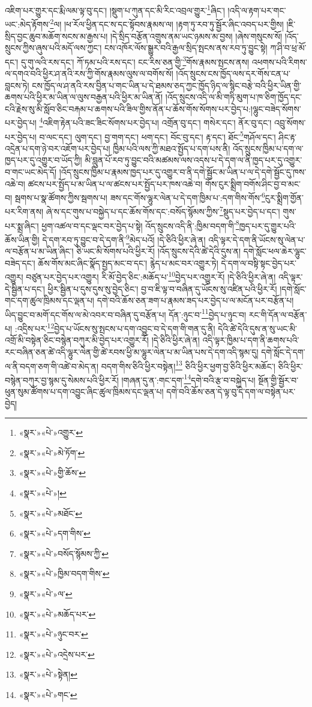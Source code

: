འཇིག་པར་གྱུར་དང་རྨི་ལམ་ལྟ་བུ་དང་། །སྡུག་པ་ཀུན་དང་མི་རིང་འབྲལ་གྱུར་\footnote{«སྣར་»«པེ་»འགྱུར་}ཞིང་། །འདི་ལ་རྟག་པར་གང་ཡང་:མེད་རྟོགས་\footnote{«སྣར་»«པེ་»མེ་ཏོག་}ལ། །ཕ་རོལ་ཕྱིན་དང་ས་དང་སྟོབས་རྣམས་ལ། །རྟག་ཏུ་རབ་ཏུ་སྦྱོར་ཞིང་འབད་པར་གྱིས། །ཇི་སྲིད་བྱང་ཆུབ་མཆོག་སངས་མ་རྒྱས་པ། །དེ་སྲིད་བརྩོན་འགྲུས་ནམ་ཡང་ཉམས་མ་བྱས། །ཞེས་གསུངས་སོ། །འོད་སྲུངས་ཀྱིས་ཞུས་པའི་མདོ་ལས་ཀྱང་། ངས་འཁོར་ལོས་སྒྱུར་བའི་རྒྱལ་སྲིད་སྤངས་ནས་རབ་ཏུ་བྱུང་སྟེ། ཀ་ཤི་བ་ཕྲ་མོ་དང་། དུ་གུ་ལའི་རས་དང་། ཀོ་ཏམ་པའི་རས་དང་། ངང་རིས་ཅན་གྱི་\footnote{«སྣར་»«པེ་»གྱི་ཆོས་}གོས་རྣམས་སྤངས་ནས། འཕགས་པའི་རིགས་ལ་དགའ་བའི་ཕྱིར་ཤ་ནའི་རས་ཀྱི་གོས་རྣམས་ལུས་ལ་བགོས་སོ། །འོད་སྲུངས་ངས་ཁྱོད་ལས་དར་གོས་ངན་པ་བླངས་ཏེ། ངས་ཁྱོད་ལ་ཤ་ནའི་རས་བྱིན་པ་གང་ཡིན་པ་དེ་ཐམས་ཅད་ཀྱང་ཁྱོད་ཉིད་ལ་སྙིང་བརྩེ་བའི་ཕྱིར་ཡིན་གྱི་ཆགས་པའི་ཕྱིར་མ་ཡིན་ལ་ལུས་བརྒྱན་པའི་ཕྱིར་མ་ཡིན་ནོ། །འོད་སྲུངས་འདི་ལ་མི་གཏི་མུག་པ་ཁ་ཅིག་ཁྱོད་དང་ངའི་རྗེས་སུ་མི་སློབ་ཅིང་བརྐམ་པ་ཆགས་པའི་ཟིལ་གྱིས་ནོན་པ་ཆོས་གོས་སོགས་པར་བྱེད་པ:།ལྷུང་བཟེད་སོགས་པར་བྱེད་པ། \footnote{«སྣར་»«པེ་»། }འཇིག་རྟེན་པའི་ཟང་ཟིང་སོགས་པར་བྱེད་པ། འགྲོན་བུ་དང་། གསེར་དང་། ནོར་བུ་དང་། འབྲུ་སོགས་པར་བྱེད་པ། བ་ལང་དང་། ལུག་དང་། བྱ་གག་དང་། ཕག་དང་། བོང་བུ་དང་། རྟ་དང་། ཐོང་\footnote{«སྣར་»«པེ་»མཐོང་}གཤོལ་དང་། ཤིང་རྟ་འདྲེན་པ་དག་ཉེ་བར་འཇོག་པར་བྱེད་པ། ཁྱིམ་པའི་ལས་ཀྱི་མཐའ་སྤྱོད་པ་དག་པས་ནི། འོད་སྲུངས་ཁྱིམ་པ་དག་ལ་ཁྱད་པར་དུ་འགྱུར་བ་ཡོད་ཀྱི། མི་བླུན་པོ་རབ་ཏུ་བྱུང་བའི་མཚམས་ལས་འདས་པ་དེ་དག་ལ་ནི་ཁྱད་པར་དུ་འགྱུར་བ་གང་ཡང་མེད་དོ། །འོད་སྲུངས་ཁྱིམ་པ་རྣམས་ཁྱད་པར་དུ་འགྱུར་བ་ནི་དགེ་སྦྱོང་མ་ཡིན་པ་ལ་དེ་དགེ་སྦྱོང་དུ་ཁས་འཆེ་བ། ཚངས་པར་སྤྱོད་པ་མ་ཡིན་པ་ལ་ཚངས་པར་སྤྱོད་པར་ཁས་འཆེ་བ། གོས་ངུར་སྨྲིག་བགོས་ཤིང་བྱ་བ་མང་བ། སྦགས་པ་སྣ་ཚོགས་ཀྱིས་སྦགས་པ། ཟས་དང་གོས་ལྷུར་ལེན་པ་དེ་དག་ཁྱིམ་པ་:དག་གིས་གོས་\footnote{«སྣར་»«པེ་»དག་གིས་}ངུར་སྨྲིག་གྱོན་པར་རིག་ནས། ཞེ་ས་དང་གུས་པ་བསྐྱེད་པ་དང་ཆོས་གོས་དང་:བསོད་སྙོམས་ཀྱིས་\footnote{«སྣར་»«པེ་»བསོད་སྙོམས་ཀྱི་}སྡུད་པར་བྱེད་པ་དང་། གུས་པར་སྨྲ་ཞིང་། ཕྱག་འཚལ་བ་དང་ལྡང་བར་བྱེད་པ་སྟེ། འོད་སྲུངས་འདི་ནི་:ཁྱིམ་བདག་གི་\footnote{«སྣར་»«པེ་»ཁྱིམ་བདག་གིས་}ཁྱད་པར་དུ་གྱུར་པའི་ཆོས་ཡིན་གྱི། དེ་དག་རབ་ཏུ་བྱུང་བ་དེ་དག་ནི་\footnote{«སྣར་»«པེ་»ལ་}མེད་པའོ། །དེ་ཅིའི་ཕྱིར་ཞེ་ན། འདི་ལྟར་དེ་དག་ནི་ཡོངས་སུ་ལེན་པ་ལ་བརྩོན་པ་མ་ཡིན་ཞིང་། ཅི་ཡང་མི་སོགས་པའི་ཕྱིར་རོ། །འོད་སྲུངས་དེའི་ཚེ་དེའི་དུས་ན། དགེ་སློང་ཕལ་ཆེར་ལྷུང་བཟེད་དང་། ཆོས་གོས་མང་ཞིང་སྣོད་སྤྱད་མང་བ་དང་། རྙེད་པ་མང་བར་འགྱུར་ཏེ། དེ་དག་ལ་བསྟི་སྟང་བྱེད་པར་འགྱུར། བཙུན་པར་བྱེད་པར་འགྱུར། རི་མོ་བྱེད་ཅིང་:མཆོད་པ་\footnote{«སྣར་»«པེ་»མཆོད་པར་}བྱེད་པར་འགྱུར་རོ། །དེ་ཅིའི་ཕྱིར་ཞེ་ན། འདི་ལྟར་དེ་སྦྱིན་པ་དང་། ཕྱིར་སྦྱིན་པ་དུས་དུས་སུ་བྱེད་ཅིང་། བྱ་བ་ཇི་ལྟ་བ་བཞིན་དུ་ཡོངས་སུ་འཛིན་པའི་ཕྱིར་རོ། །དགེ་སློང་གང་དག་ཚུལ་ཁྲིམས་དང་ལྡན་པ། དགེ་བའི་ཆོས་ཅན་ཟག་པ་རྣམས་ཟད་པར་བྱེད་པ་ལ་མངོན་པར་བརྩོན་པ། ཡིད་བྱུང་བ་མགོ་དང་གོས་ལ་མེ་འབར་བ་བཞིན་དུ་བརྩོན་པ། དོན་:ཉུང་བ་\footnote{«སྣར་»«པེ་»ཉུང་བར་}བྱེད་པ་ཉུང་བ། རང་གི་དོན་ལ་བརྩོན་པ། :འདྲིས་པར་\footnote{«སྣར་»«པེ་»འདྲེས་པར་}བྱེད་པ་ཡོངས་སུ་སྤངས་པ་དག་འབྱུང་བ་དེ་དག་གི་གན་དུ་ནི། དེའི་ཚེ་དེའི་དུས་ན་སུ་ཡང་མི་འགྲོ་མི་བསྟེན་ཅིང་བསྙེན་བཀུར་མི་བྱེད་པར་འགྱུར་རོ། །དེ་ཅིའི་ཕྱིར་ཞེ་ན། འདི་ལྟར་ཁྱིམ་པ་དག་ནི་ཆགས་པའི་རང་བཞིན་ཅན་ཚེ་འདི་ལྷུར་ལེན་གྱི་ཚེ་རབས་ཕྱི་མ་ལྷུར་ལེན་པ་མ་ཡིན་པས་དེ་དག་འདི་སྙམ་དུ། དགེ་སློང་དེ་དག་ལ་ནི་བདག་ཅག་གི་འཚེ་བ་མེད་ན། བདག་གིས་ཅིའི་ཕྱིར་བསྟེན།\footnote{«སྣར་»«པེ་»སྟེན།} ཅིའི་ཕྱིར་ཕྱག་བྱ་ཅིའི་ཕྱིར་མཆོང་། ཅིའི་ཕྱིར་བསྙེན་བཀུར་བྱ་སྙམ་དུ་སེམས་པའི་ཕྱིར་རོ། །གཞན་དུ་ན་:གང་དག་\footnote{«སྣར་»«པེ་»གང་}དགེ་བའི་རྩ་བ་བསྐྱེད་པ། སྔོན་གྱི་སྦྱོར་བ་ཕུན་སུམ་ཚོགས་པ་དག་འབྱུང་ཞིང་ཚུལ་ཁྲིམས་དང་ལྡན་པ། དགེ་བའི་ཆོས་ཅན་དེ་ལྟ་བུ་དེ་དག་ལ་བསྟེན་པར་བྱེད། 